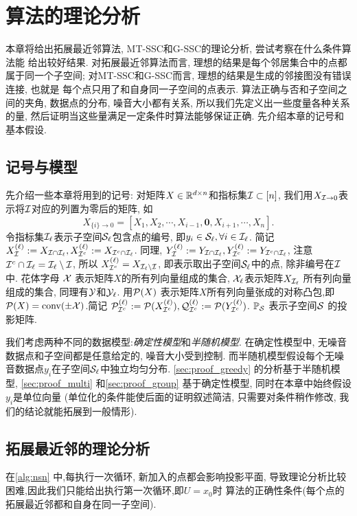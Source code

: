 \chapter{算法的理论分析}\label{chp:theory}
本章将给出拓展最近邻算法, MT-SSC和G-SSC的理论分析, 尝试考察在什么条件算法能
给出较好结果. 对拓展最近邻算法而言, 理想的结果是每个邻居集合中的点都属于同一个子空间;
对MT-SSC和G-SSC而言, 理想的结果是生成的邻接图没有错误连接, 也就是
每个点只用了和自身同一子空间的点表示. 算法正确与否和子空间之间的夹角, 
数据点的分布, 噪音大小都有关系, 所以我们先定义出一些度量各种关系的量,
然后证明当这些量满足一定条件时算法能够保证正确. 先介绍本章的记号和基本假设.

\section{记号与模型}
先介绍一些本章将用到的记号:
对矩阵\(X\in\mathbb{R}^{d\times n}\)和指标集\(\mathcal{I} \subset [n]\),
我们用\(X_{\mathcal{I}\rightarrow 0}\)表示将\(\mathcal{I}\)对应的列置为零后的矩阵,
如
\[
  X_{\{i\}\rightarrow 0} = \left[ X_1, X_2, \cdots, X_{i-1}, \mathbf{0},
  X_{i+1}, \cdots, X_n \right].
\]
令指标集\(\mathcal{I}_\ell\)表示子空间\(\mathcal{S}_\ell\)包含点的编号,
即\(y_i\in \mathcal{S}_\ell, \forall i\in \mathcal{I}_\ell\).
简记\(X_{\mathcal{I}}^{(\ell)}:=X_{\mathcal{I}\cap\mathcal{I}_\ell}, X_{\mathcal{I}^c}^{(\ell)}:=X_{\mathcal{I}^c\cap \mathcal{I}_\ell}\).
同理, \(Y_{\mathcal{I}}^{(\ell)}:=Y_{\mathcal{I}\cap \mathcal{I}_\ell}, Y_{\mathcal{I}^c}^{(\ell)}:=Y_{\mathcal{I}^c\cap
\mathcal{I}_\ell}\),
注意 \(\mathcal{I}^c \cap \mathcal{I}_\ell = \mathcal{I}_\ell \setminus \mathcal{I}\), 所以
\(X_{\mathcal{I}^c}^{(\ell)} = X_{\mathcal{I}_\ell \setminus \mathcal{I}}\),
即表示取出子空间\(\mathcal{S}_\ell\)中的点, 除非编号在\(\mathcal{I}\)中.
花体字母 \(\mathcal{X}\) 表示矩阵\(X\)的所有列向量组成的集合, \(\mathcal{X}_\ell\)表示矩阵\(X_{\mathcal{I}_\ell}\)
所有列向量组成的集合, 同理有\(\mathcal{Y}\)和\(\mathcal{Y}_\ell\).
用\(\mathcal{P}(X)\) 表示矩阵\(X\)所有列向量张成的对称凸包,即
\(\mathcal{P}(X) = \mathrm{conv}(\pm \mathcal{X})\).简记
\(\mathcal{P}_{\mathcal{I}^c}^{(\ell)} := \mathcal{P}(X_{\mathcal{I}^c}^{(\ell)}),
\mathcal{Q}_{\mathcal{I}^c}^{(\ell)} :=\mathcal{P}(Y_{\mathcal{I}^c}^{(\ell)})\).
\(\mathbb{P}_{\mathcal{S}}\) 表示子空间\(\mathcal{S}\) 的投影矩阵.

我们考虑两种不同的数据模型:\emph{确定性模型}和\emph{半随机模型}\cite[1.4.1]{soltanolkotabi2012geometric}.
在确定性模型中, 无噪音数据点和子空间都是任意给定的, 噪音大小受到控制.
而半随机模型假设每个无噪音数据点\(y_i\)在子空间\(\mathcal{S}_\ell\)中独立均匀分布.
\autoref{sec:proof_greedy} 的分析基于半随机模型,
\autoref{sec:proof_multi} 和\autoref{sec:proof_group} 基于确定性模型,
同时在本章中始终假设\(y_i\)是单位向量 (单位化的条件能使后面的证明叙述简洁,
只需要对条件稍作修改, 我们的结论就能拓展到一般情形).

\section{拓展最近邻的理论分析}\label{sec:proof_greedy}
在\autoref{alg:nsn} 中,每执行一次循环, 新加入的点都会影响投影平面,
导致理论分析比较困难,因此我们只能给出执行第一次循环,即\(U=x_0\)时
算法的正确性条件(每个点的拓展最近邻都和自身在同一子空间).

